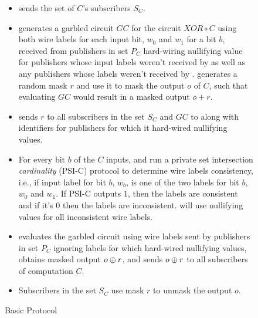 \begin{figure*}[h]
\begin{mdframed}[style=myframe]
\begin{itemize}[leftmargin=*]
	\item \broker sends \garbler the set of $C$'s subscribers $S_C$.
		
	\item \garbler generates a garbled circuit $GC$ for the circuit $XOR \circ C$
		using both wire labels for each input bit, $w_0$ and $w_1$ for a bit $b$,
		received from publishers in set $P_C$ hard-wiring nullifying value for
		publishers whose input labels weren't received by \broker as well as any
		publishers whose labels weren't received by \garbler. \garbler generates a
		random mask $r$ and use it to mask the output $o$ of $C$, such that
		evaluating $GC$ would result in a masked output $o+r$.
		
	\item \garbler sends $r$ to all subscribers in the set $S_C$ and $GC$ to
		\broker along with identifiers for publishers for which it hard-wired
		nullifying values.

	\item For every bit $b$ of the $C$ inputs, \garbler and \broker run a
		private set intersection \emph{cardinality} (PSI-C) protocol to determine
		wire labels consistency, i.e., if \broker input label for bit $b$, $w_b$,
		is one of the two \garbler labels for bit $b$, $w_0$ and $w_1$. If PSI-C
		outputs $1$, then the labels are consistent and if it's $0$ then the labels
		are inconsistent. \garbler will use nullifying values for all inconsistent
		wire labels. 
		
	\item \broker evaluates the garbled circuit using wire labels sent by
		publishers in set $P_C$ ignoring labels for which \garbler hard-wired
		nullifying values, obtains masked output $o \oplus r$, and sends $o \oplus r$
		to all subscribers of computation $C$.
  
	\item Subscribers in the set $S_C$ use mask $r$ to unmask the output $o$.

\end{itemize}

\end{mdframed}
\caption{Basic Protocol}
\label{fig:basicprotocol}
\end{figure*}


